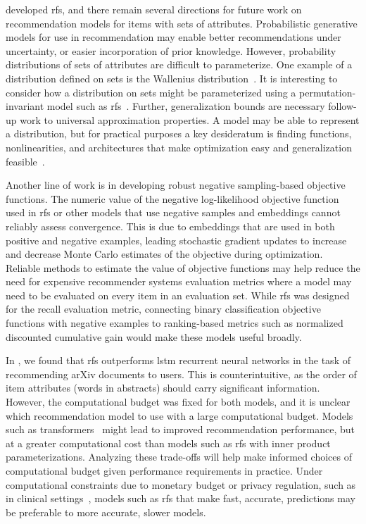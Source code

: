  developed \gls{rfs}, and there remain several directions for future work on recommendation models for items with sets of attributes. Probabilistic generative models for use in recommendation may enable better recommendations under uncertainty, or easier incorporation of prior knowledge. However, probability distributions of sets of attributes are difficult to parameterize. One example of a distribution defined on sets is the Wallenius distribution~\citep{wallenius1963biased,junqu2000wallenius}. It is interesting to consider how a distribution on sets might be parameterized using a permutation-invariant model such as \gls{rfs}~\citep{bloem-reddy2019probabilistic,lee2018set-transformer}. Further, generalization bounds are necessary follow-up work to universal approximation properties. A model may be able to represent a distribution, but for practical purposes a key desideratum is finding functions, nonlinearities, and architectures that make optimization easy and generalization feasible~\citep{dziugaite2017computing}.

Another line of work is in developing robust negative sampling-based objective functions. The numeric value of the negative log-likelihood objective function used in \gls{rfs} or other models that use negative samples and embeddings cannot reliably assess convergence. This is due to embeddings that are used in both positive and negative examples, leading stochastic gradient updates to increase and decrease Monte Carlo estimates of the objective during optimization. Reliable methods to estimate the value of objective functions may help reduce the need for expensive recommender systems evaluation metrics where a model may need to be evaluated on every item in an evaluation set. While \gls{rfs} was designed for the recall evaluation metric, connecting binary classification objective functions with negative examples to ranking-based metrics such as normalized discounted cumulative gain would make these models useful broadly.

In , we found that \gls{rfs} outperforms \gls{lstm} recurrent neural networks in the task of recommending arXiv documents to users. This is counterintuitive, as the order of item attributes (words in abstracts) should carry significant information.  However, the computational budget was fixed for both models, and it is unclear which recommendation model to use with a large computational budget. Models such as transformers~\citep{vaswani2017attention,devlin2019bert:,lee2018set-transformer} might lead to improved recommendation performance, but at a greater computational cost than models such as \gls{rfs} with inner product parameterizations. Analyzing these trade-offs will help make informed choices of computational budget given performance requirements in practice. Under computational constraints due to monetary budget or privacy regulation, such as in clinical settings~\citep{huang2019clinicalbert:}, models such as \gls{rfs} that make fast, accurate, predictions may be preferable to more accurate, slower models.

